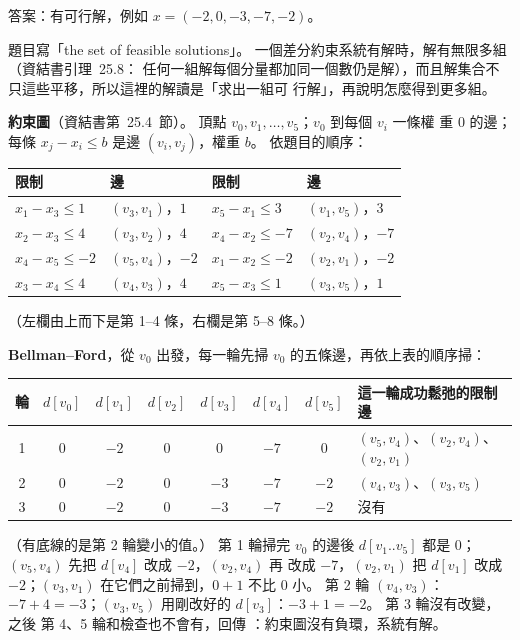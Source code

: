 \begin{pastsoln}
答案：有可行解，例如 $x = (-2, 0, -3, -7, -2)$。

題目寫「the set of feasible solutions」。 一個差分約束系統有解時，解有無限多組（資結書引理~25.8：
任何一組解每個分量都加同一個數仍是解），而且解集合不只這些平移，所以這裡的解讀是「求出一組可
行解」，再說明怎麼得到更多組。

\textbf{約束圖}（資結書第~25.4~節）。 頂點 $v_0, v_1, \ldots, v_5$；$v_0$ 到每個 $v_i$ 一條權
重 $0$ 的邊；每條 $x_j - x_i \le b$ 是邊 $(v_i, v_j)$，權重 $b$。 依題目的順序：
\begin{center}
\small
\begin{tabular}{llll}
\toprule
限制 & 邊 & 限制 & 邊 \\
\midrule
$x_1 - x_3 \le 1$ & $(v_3, v_1)$，$1$ & $x_5 - x_1 \le 3$ & $(v_1, v_5)$，$3$ \\
$x_2 - x_3 \le 4$ & $(v_3, v_2)$，$4$ & $x_4 - x_2 \le -7$ & $(v_2, v_4)$，$-7$ \\
$x_4 - x_5 \le -2$ & $(v_5, v_4)$，$-2$ & $x_1 - x_2 \le -2$ & $(v_2, v_1)$，$-2$ \\
$x_3 - x_4 \le 4$ & $(v_4, v_3)$，$4$ & $x_5 - x_3 \le 1$ & $(v_3, v_5)$，$1$ \\
\bottomrule
\end{tabular}
\end{center}
（左欄由上而下是第 1--4 條，右欄是第 5--8 條。）

\textbf{Bellman--Ford}，從 $v_0$ 出發，每一輪先掃 $v_0$ 的五條邊，再依上表的順序掃：
\begin{center}
\small
\begin{tabular}{c*{6}{c}l}
\toprule
輪 & $d[v_0]$ & $d[v_1]$ & $d[v_2]$ & $d[v_3]$ & $d[v_4]$ & $d[v_5]$ & 這一輪成功鬆弛的限制邊 \\
\midrule
1 & $0$ & $-2$ & $0$ & $0$ & $-7$ & $0$ & $(v_5, v_4)$、$(v_2, v_4)$、$(v_2, v_1)$ \\
2 & $0$ & $-2$ & $0$ & \underline{$-3$} & $-7$ & \underline{$-2$} & $(v_4, v_3)$、$(v_3, v_5)$ \\
3 & $0$ & $-2$ & $0$ & $-3$ & $-7$ & $-2$ & 沒有 \\
\bottomrule
\end{tabular}
\end{center}
（有底線的是第 2 輪變小的值。） 第 1 輪掃完 $v_0$ 的邊後 $d[v_1..v_5]$ 都是 $0$；$(v_5, v_4)$ 先把 $d[v_4]$ 改成 $-2$，$(v_2, v_4)$ 再
改成 $-7$，$(v_2, v_1)$ 把 $d[v_1]$ 改成 $-2$；$(v_3, v_1)$ 在它們之前掃到，$0 + 1$ 不比 $0$ 小。 第 2 輪
$(v_4, v_3)$：$-7 + 4 = -3$；$(v_3, v_5)$ 用剛改好的 $d[v_3]$：$-3 + 1 = -2$。 第 3 輪沒有改變，之後
第 4、5 輪和檢查也不會有，回傳 \TRUE：約束圖沒有負環，系統有解。


\end{pastsoln}
